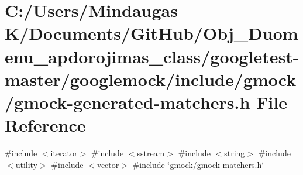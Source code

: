 \hypertarget{googletest-master_2googlemock_2include_2gmock_2gmock-generated-matchers_8h}{}\section{C\+:/\+Users/\+Mindaugas K/\+Documents/\+Git\+Hub/\+Obj\+\_\+\+Duomenu\+\_\+apdorojimas\+\_\+class/googletest-\/master/googlemock/include/gmock/gmock-\/generated-\/matchers.h File Reference}
\label{googletest-master_2googlemock_2include_2gmock_2gmock-generated-matchers_8h}
{\ttfamily \#include $<$iterator$>$}\newline
{\ttfamily \#include $<$sstream$>$}\newline
{\ttfamily \#include $<$string$>$}\newline
{\ttfamily \#include $<$utility$>$}\newline
{\ttfamily \#include $<$vector$>$}\newline
{\ttfamily \#include \char`\"{}gmock/gmock-\/matchers.\+h\char`\"{}}\newline
